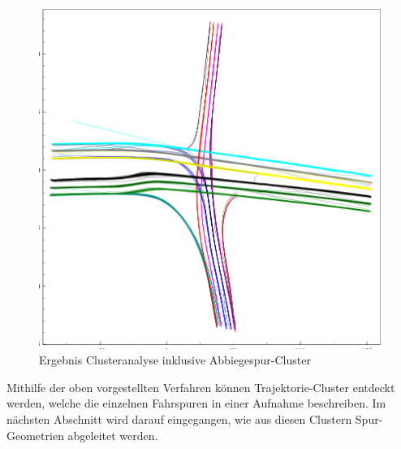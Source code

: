 \begin{figure}[H]
    \centering
    \includegraphics[width=0.35\linewidth]{resources/img/umsetzung/U1/clusters_with_turning_lanes}
    \caption{Ergebnis Clusteranalyse inklusive Abbiegespur-Cluster}
    \label{fig:real_turning_lane_result}
\end{figure}

Mithilfe der oben vorgestellten Verfahren können Trajektorie-Cluster entdeckt werden, welche
die einzelnen Fahrspuren in einer Aufnahme beschreiben. Im nächsten Abschnitt wird darauf eingegangen,
wie aus diesen Clustern Spur-Geometrien abgeleitet werden.